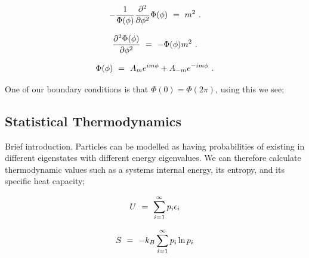 \documentclass{article}
\begin{document}
\begin{equation} \label{eq:256}
- \frac{1}{\Phi(\phi)} \frac{\partial^{2}}{\partial{\phi^{2}}} \Phi(\phi) \hspace{0.125cm} = \hspace{0.125cm} m^2 \hspace{0.125cm}.
\end{equation}

\begin{equation} \label{eq:256}
\frac{\partial^{2}{\Phi(\phi)}}{\partial{\phi^{2}}} \hspace{0.125cm} = \hspace{0.125cm} - \Phi(\phi) m^2 \hspace{0.125cm}.
\end{equation}

\begin{equation} \label{eq:256}
\Phi(\phi) \hspace{0.125cm} = \hspace{0.125cm} A_{m} e^{im\phi} + A_{-m} e^{-im\phi} \hspace{0.125cm}.
\end{equation}

One of our boundary conditions is that \begin{math} \Phi(0) = \Phi(2 \pi) \end{math}, using this we see; 





\subsection{Statistical Thermodynamics}

Brief introduction. Particles can be modelled as having probabilities of existing in different eigenstates with different energy eigenvalues. We can therefore calculate thermodynamic values such as a systems internal energy, its entropy, and its specific heat capacity;

\begin{equation} \label{eq:256}
U \hspace{0.125cm} = \hspace{0.125cm} \sum_{i = 1}^{\infty} p_i \epsilon_i
\end{equation}

\begin{equation} \label{eq:256}
S \hspace{0.125cm} = \hspace{0.125cm} - k_B \sum_{i = 1}^{\infty} p_i \ln{p_i}
\end{equation}
\end{document}
